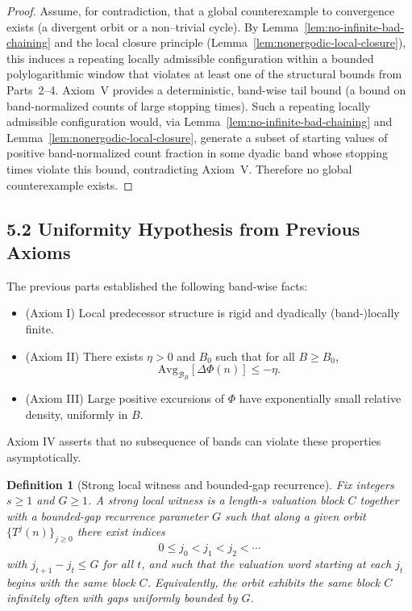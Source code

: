 \documentclass[preprint,12pt]{elsarticle}
\newtheorem{definition}{Definition}
\newcommand{\BandAvg}[2]{\mathrm{Avg}_{#1}\!\left[#2\right]}  %
\begin{document}
\begin{proof}
Assume, for contradiction, that a global counterexample to convergence exists
(a divergent orbit or a non--trivial cycle). By Lemma~\ref{lem:no-infinite-bad-chaining}
and the local closure principle (Lemma~\ref{lem:nonergodic-local-closure}),
this induces a repeating locally admissible configuration within a bounded
polylogarithmic window that violates at least one of the structural bounds from
Parts~2--4.
Axiom~V provides a deterministic, band-wise tail bound (a bound on band-normalized counts of large stopping times).
Such a repeating locally admissible configuration would, via Lemma~\ref{lem:no-infinite-bad-chaining} and Lemma~\ref{lem:nonergodic-local-closure},
generate a subset of starting values of positive band-normalized count fraction in some dyadic band whose stopping times violate this bound, contradicting Axiom~V.
Therefore no global counterexample exists.
\end{proof}


\subsection{5.2 Uniformity Hypothesis from Previous Axioms}
The previous parts established the following band-wise facts:
\begin{itemize}
\item (Axiom I) Local predecessor structure is rigid and dyadically (band-)locally finite.
\item (Axiom II) There exists $\eta>0$ and $B_0$ such that for all $B\ge B_0$,
\[
\BandAvg{\mathcal{B}_B}{\Delta\Phi(n)} \le -\eta.
\]
\item (Axiom III) Large positive excursions of $\Phi$ have exponentially small relative density, uniformly in $B$.
\end{itemize}
Axiom IV asserts that no subsequence of bands can violate these properties asymptotically.

\begin{definition}[Strong local witness and bounded-gap recurrence]
\label{def:strong-witness}
Fix integers $s\ge 1$ and $G\ge 1$.
A \emph{strong local witness} is a length-$s$ valuation block $C$ together with a
bounded-gap recurrence parameter $G$ such that along a given orbit
$\{T^j(n)\}_{j\ge 0}$ there exist indices
\[
0\le j_0 < j_1 < j_2 < \cdots
\]
with $j_{t+1}-j_t \le G$ for all $t$, and such that the valuation word starting
at each $j_t$ begins with the same block $C$.
Equivalently, the orbit exhibits the same block $C$ infinitely often with gaps
uniformly bounded by $G$.
\end{definition}
\end{document}

